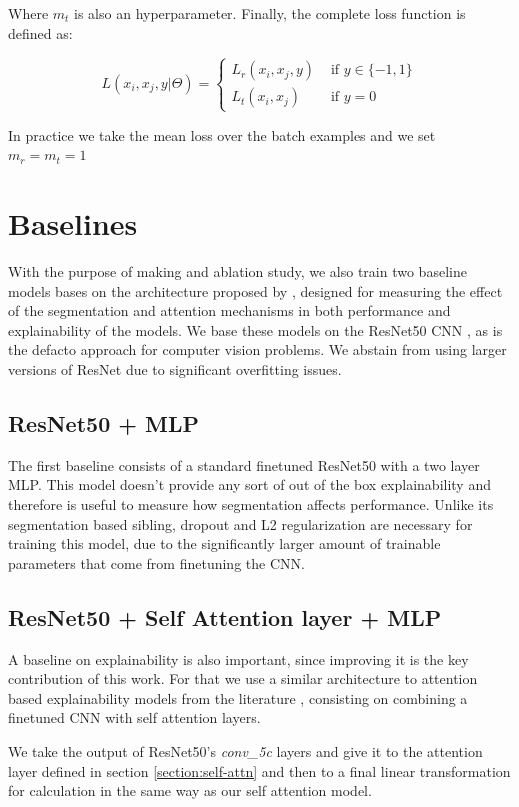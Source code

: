 Where $m_t$ is also an hyperparameter. Finally, the complete loss function is defined as:

\begin{equation}
	L(x_i,x_j,y | \Theta) =\left\{\begin{matrix}
		L_r(x_i,x_j,y)&\text{ if } y \in \{-1,1\} \\
		L_t(x_i,x_j)&\text{ if } y=0
	\end{matrix}\right.
\end{equation}

In practice we take the mean loss over the batch examples and we set $m_r=m_t=1$

\section{Baselines}
With the purpose of making and ablation study, we also train two baseline models
bases on the architecture proposed by , designed for
measuring the effect of the segmentation and attention mechanisms in both performance
and explainability of the models. We base these models on the ResNet50 CNN \cite{he_resnet},
as is the defacto approach for computer vision problems. We abstain from using larger
versions of ResNet due to significant overfitting issues.

\subsection{ResNet50 + MLP}
The first baseline consists of a standard finetuned ResNet50 with a two layer MLP. This
model doesn't provide any sort of out of the box explainability and therefore is useful
to measure how segmentation affects performance.
Unlike its segmentation based sibling, dropout and L2 regularization are necessary for training
this model, due to the significantly larger amount of trainable parameters that come from finetuning the CNN.

\subsection{ResNet50 + Self Attention layer + MLP}

A baseline on explainability is also important, since improving it is the key contribution
of this work. For that we use a similar architecture to attention based explainability
models from the literature \cite{zhang_interpretable, cordonnier_relationship, bello_attention}, consisting on
combining a finetuned CNN with self attention layers.

We take the output of ResNet50's \textit{conv\_5c} layers and give it to the attention layer
defined in section \ref{section:self-attn} and then to a final linear transformation for calculation
in the same way as our self attention model.
